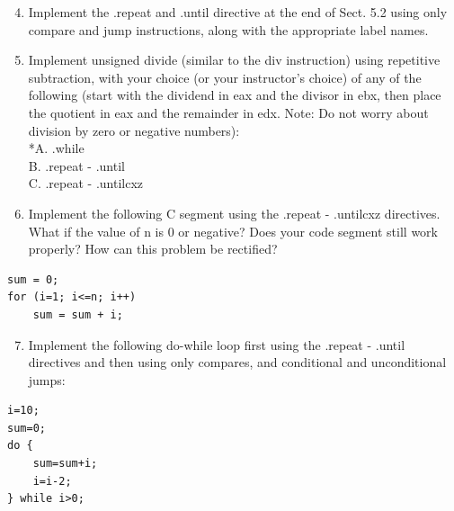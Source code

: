 \documentclass[10pt]{book}
\begin{document}
\begin{enumerate}
  \setcounter{enumi}{3}
  \item Implement the .repeat and .until directive at the end of Sect. 5.2 using only compare and jump instructions, along with the appropriate label names.
  \item Implement unsigned divide (similar to the div instruction) using repetitive subtraction, with your choice (or your instructor's choice) of any of the following (start with the dividend in eax and the divisor in ebx, then place the quotient in eax and the remainder in edx. Note: Do not worry about division by zero or negative numbers):\\
*A. .while\\
B. .repeat - .until\\
C. .repeat - .untilcxz
  \item Implement the following C segment using the .repeat - .untilcxz directives. What if the value of n is 0 or negative? Does your code segment still work properly? How can this problem be rectified?
\end{enumerate}

\begin{verbatim}
sum = 0;
for (i=1; i<=n; i++)
    sum = sum + i;
\end{verbatim}

\begin{enumerate}
  \setcounter{enumi}{6}
  \item Implement the following do-while loop first using the .repeat - .until directives and then using only compares, and conditional and unconditional jumps:
\end{enumerate}

\begin{verbatim}
i=10;
sum=0;
do {
    sum=sum+i;
    i=i-2;
} while i>0;
\end{verbatim}
\end{document}
